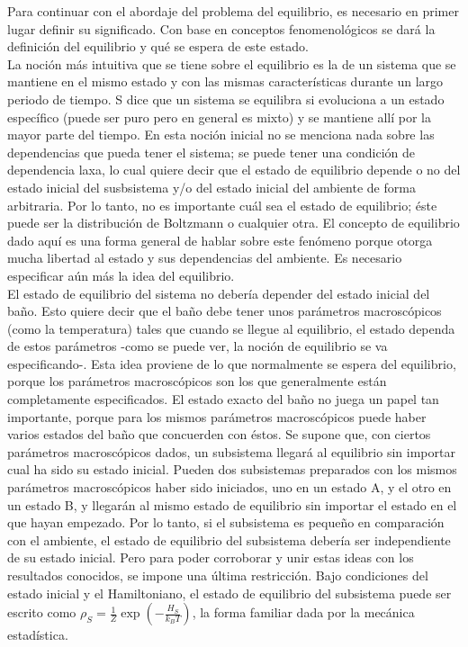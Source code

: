 Para continuar con el abordaje del problema del equilibrio, es necesario en primer lugar definir su significado. Con base en conceptos fenomenológicos se dará la  definición del equilibrio y qué se espera de este estado.
\\
La noción más intuitiva que se tiene sobre el equilibrio es la de un sistema que se mantiene en el mismo estado y con las mismas características durante un largo periodo de tiempo. S dice que un sistema se equilibra si evoluciona a un estado específico (puede ser puro pero en general es mixto) y se mantiene allí por la mayor parte del tiempo. En esta noción inicial no se menciona nada sobre las dependencias que pueda tener el sistema; se puede tener una condición de dependencia laxa, lo cual quiere decir que el estado de equilibrio depende o no del estado inicial del susbsistema y/o del estado inicial del ambiente de forma arbitraria. Por lo tanto, no es importante cuál sea el estado de equilibrio; éste puede ser la distribución de Boltzmann o cualquier otra. El concepto de equilibrio dado aquí es una forma general de hablar sobre este fenómeno porque otorga mucha libertad al estado y sus dependencias del ambiente. Es necesario especificar aún más la idea del equilibrio.
\\
El estado de equilibrio del sistema no debería depender del estado inicial del baño. Esto quiere decir que el baño debe tener unos parámetros macroscópicos (como la temperatura) tales que cuando se llegue al equilibrio, el estado dependa de estos parámetros -como se puede ver, la noción de equilibrio se va especificando-. Esta idea proviene de lo que normalmente se espera del equilibrio, porque los parámetros macroscópicos son los que generalmente están completamente especificados. El estado exacto del baño no juega un papel tan importante, porque para los mismos parámetros macroscópicos puede haber varios estados del baño que concuerden con éstos. Se supone que, con ciertos parámetros macroscópicos dados, un subsistema llegará al equilibrio sin importar cual ha sido su estado inicial. Pueden dos subsistemas preparados con los mismos parámetros macroscópicos haber sido iniciados, uno en un estado A, y el otro en un estado B, y llegarán al mismo estado de equilibrio sin importar el estado en el que hayan empezado.  Por lo tanto, si el subsistema es pequeño en comparación con el ambiente, el estado de equilibrio del subsistema debería ser independiente de su estado inicial. Pero para poder corroborar y unir estas ideas con los resultados conocidos, se impone una última restricción. Bajo condiciones del estado inicial y el Hamiltoniano, el estado de equilibrio del subsistema puede ser escrito como $\rho_{S}= \frac{1}{Z} \exp(-\frac{H_{S}}{k_{B}T})$, la forma familiar dada por la mecánica estadística.
